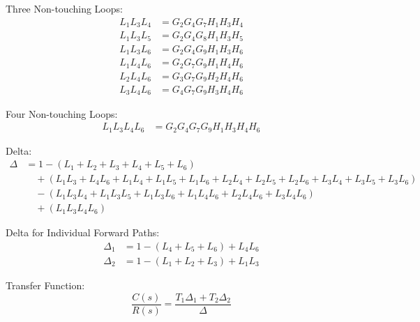\documentclass[11pt]{article}
\begin{document}
\vspace{0.5em}

Three Non-touching Loops:
\begin{align*}
L_1 L_3 L_4 &= G_2 G_4 G_7 H_1 H_3 H_4 \\
L_1 L_3 L_5 &= G_2 G_4 G_8 H_1 H_3 H_5 \\
L_1 L_3 L_6 &= G_2 G_4 G_9 H_1 H_3 H_6 \\
L_1 L_4 L_6 &= G_2 G_7 G_9 H_1 H_4 H_6 \\
L_2 L_4 L_6 &= G_3 G_7 G_9 H_2 H_4 H_6 \\
L_3 L_4 L_6 &= G_4 G_7 G_9 H_3 H_4 H_6
\end{align*}

\vspace{0.5em}

Four Non-touching Loops:
\begin{align*}
L_1 L_3 L_4 L_6 &= G_2 G_4 G_7 G_9 H_1 H_3 H_4 H_6
\end{align*}

\vspace{0.5em}

Delta:
{\small
\begin{align*}
\Delta &= 1 - (L_1 + L_2 + L_3 + L_4 + L_5 + L_6) \\
&\quad + (L_1 L_3 + L_4 L_6 + L_1 L_4 + L_1 L_5 + L_1 L_6 + L_2 L_4 + L_2 L_5 + L_2 L_6 + L_3 L_4 + L_3 L_5 + L_3 L_6) \\
&\quad - (L_1 L_3 L_4 + L_1 L_3 L_5 + L_1 L_3 L_6 + L_1 L_4 L_6 + L_2 L_4 L_6 + L_3 L_4 L_6) \\
&\quad + (L_1 L_3 L_4 L_6)
\end{align*}
}

\vspace{0.5em}

Delta for Individual Forward Paths:
\begin{align*}
\Delta_1 &= 1 - (L_4 + L_5 + L_6) + L_4 L_6 \\
\Delta_2 &= 1 - (L_1 + L_2 + L_3) + L_1 L_3
\end{align*}

\vspace{0.5em}

Transfer Function:
\[
\frac{C(s)}{R(s)} = \frac{T_1 \Delta_1 + T_2 \Delta_2}{\Delta}
\]
\end{document}
